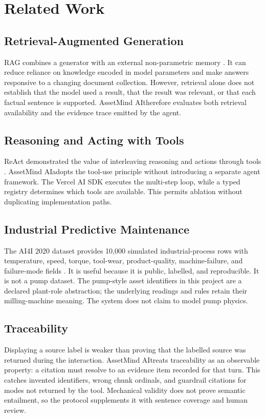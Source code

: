\documentclass[conference]{IEEEtran}
\newcommand{\system}{AssetMind AI}
\begin{document}
\section{Related Work}
\subsection{Retrieval-Augmented Generation}
RAG combines a generator with an external non-parametric memory
\cite{lewis2020rag}. It can reduce reliance on knowledge encoded in model
parameters and make answers responsive to a changing document collection.
However, retrieval alone does not establish that the model used a result,
that the result was relevant, or that each factual sentence is supported.
\system therefore evaluates both retrieval availability and the evidence
trace emitted by the agent.

\subsection{Reasoning and Acting with Tools}
ReAct demonstrated the value of interleaving reasoning and actions through
tools \cite{yao2023react}. \system adopts the tool-use principle without
introducing a separate agent framework. The Vercel AI SDK executes the
multi-step loop, while a typed registry determines which tools are
available. This permits ablation without duplicating implementation paths.

\subsection{Industrial Predictive Maintenance}
The AI4I 2020 dataset provides 10,000 simulated industrial-process rows with
temperature, speed, torque, tool-wear, product-quality, machine-failure, and
failure-mode fields \cite{matzka2020ai4i}. It is useful because it is public,
labelled, and reproducible. It is not a pump dataset. The pump-style asset
identifiers in this project are a declared plant-role abstraction; the
underlying readings and rules retain their milling-machine meaning. The
system does not claim to model pump physics.

\subsection{Traceability}
Displaying a source label is weaker than proving that the labelled source
was returned during the interaction. \system treats traceability as an
observable property: a citation must resolve to an evidence item recorded
for that turn. This catches invented identifiers, wrong chunk ordinals, and
guardrail citations for modes not returned by the tool. Mechanical validity
does not prove semantic entailment, so the protocol supplements it with
sentence coverage and human review.
\end{document}
